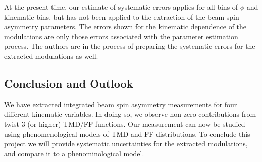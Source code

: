 At the present time, our estimate of systematic errors applies for all bins of $\phi$ and kinematic bins, but has not been applied to the extraction of the beam spin asymmetry parameters.  The errors shown for the kinematic dependence of the modulations are only those errors associated with the parameter estimation process.  The authors are in the process of preparing the systematic errors for the extracted modulations as well.


\subsection{Conclusion and Outlook}
We have extracted integrated beam spin asymmetry measurements for four different kinematic variables.  In doing so, we observe non-zero contributions from twist-3 (or higher) TMD/FF functions.  Our measurement can now be studied using phenomenological models of TMD and FF distributions.  To conclude this project we will provide systematic uncertainties for the extracted modulations, and compare it to a phenominological model.
